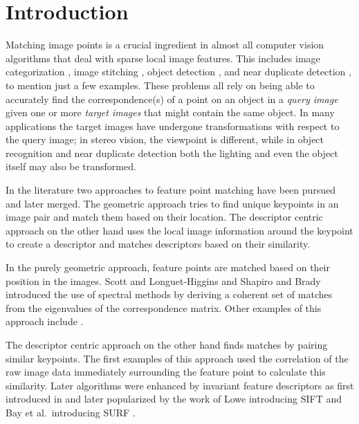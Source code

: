 \documentclass[10pt,journal,cspaper,compsoc]{IEEEtran}
\begin{document}
%
\IEEEpeerreviewmaketitle





\section{Introduction}
%
Matching image points is a crucial ingredient in almost all computer 
vision algorithms that deal with sparse local image features. This 
includes image categorization \cite{bosch2008scene}, image stitching 
\cite{brown2007automatic}, object detection \cite{zhang2007local}, and 
near duplicate detection \cite{zhao2009scale}, to mention just a few examples.  
These problems all rely on being able to accurately find the 
correspondence(s) of a point on an object in a \emph{query image} given 
one or more \emph{target images} that might contain the same object.  In 
many applications the target images have undergone transformations with 
respect to the query image; in stereo vision, the viewpoint is 
different, while in object recognition and near duplicate detection both 
the lighting and even the object itself may also be transformed.

In the literature two approaches to feature point matching have been 
pursued and later merged. The geometric approach tries to find unique 
keypoints in an image pair and match them based on their location.  The 
descriptor centric approach on the other hand uses the local image 
information around the keypoint to create a descriptor and matches 
descriptors based on their similarity.

In the purely geometric approach, feature points are matched based on their position in the images. 
Scott and Longuet-Higgins 
\cite{scott1991algorithm} and Shapiro and Brady 
\cite{shapiro1992feature} introduced the use of spectral methods by 
deriving a coherent set of matches from the eigenvalues of the 
correspondence matrix. Other examples of this approach include \cite{sclaroff1995modal,carcassoni2003spectral}.

The descriptor centric approach on the other hand finds matches by 
pairing similar keypoints. The first 
examples of this approach used the correlation of the raw image data 
immediately surrounding the feature point \cite{deriche1994robust,baumberg2000reliable} to calculate this similarity. Later 
algorithms were enhanced by invariant feature descriptors as first 
introduced in \cite{schmid1997local} and later popularized by the work 
of Lowe introducing SIFT \cite{lowe2004sift} and Bay et al.\ introducing SURF 
\cite{bay2006surf}.
\end{document}
